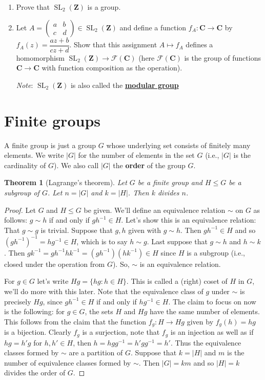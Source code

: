 \documentclass[12pt]{article}
\numberwithin{equation}{subsection}
\newtheorem{thm}[subsection]{Theorem}
\theoremstyle{note}
\newcommand{\SL}{\operatorname{SL}}
\begin{document}
\begin{enumerate}[label=\arabic*.]
	\begin{enumerate}
		\item Prove that $\SL_2(\mathbf{Z})$ is a group.
		\item Let $A=\begin{pmatrix} a & b \\ c & d \end{pmatrix} \in \SL_2(\mathbf{Z})$ and define a function $f_A\colon\mathbf{C}\to\mathbf{C}$ by $f_A(z)=\dfrac{az+b}{cz+d}$. Show that this assignment $A\mapsto f_A$ defines a homomorphism $\SL_2(\mathbf{Z})\to\mathcal{F}(\mathbf{C})$ (here $\mathcal{F}(\mathbf{C})$ is the group of functions $\mathbf{C}\to\mathbf{C}$ with function composition as the operation). 
		
		\textit{Note}: $\SL_2(\mathbf{Z})$ is also called the \href{https://en.wikipedia.org/wiki/Modular_group}{\textbf{modular group}}
	\end{enumerate}
\end{enumerate}


\section{Finite groups}
A finite group is just a group $G$ whose underlying set consists of finitely many elements. We write $|G|$ for the number of elements in the set $G$ (i.e., $|G|$ is the cardinality of $G$). We also call $|G|$ the \textbf{order} of the group $G$. 


\begin{thm}[Lagrange's theorem]\label{Lag-thm}
	Let $G$ be a finite group and $H\leq G$ be a subgroup of $G$. Let $n=|G|$ and $k=|H|$. Then $k$ divides $n$. 
\end{thm}

\begin{proof}
	Let $G$ and $H\leq G$ be given. We'll define an equivalence relation $\sim$ on $G$ as follows: $g\sim h$ if and only if $gh^{-1}\in H$. Let's show this is an equivalence relation: That $g\sim g$ is trivial. Suppose that $g,h$ given with $g\sim h$. Then $gh^{-1}\in H$ and so $(gh^{-1})^{-1}=hg^{-1}\in H$, which is to say $h\sim g$. Last suppose that $g\sim h$ and $h\sim k$. Then $gk^{-1}=gh^{-1}hk^{-1}=(gh^{-1})(hk^{-1})\in H$ since $H$ is a subgroup (i.e., closed under the operation from $G$). So, $\sim$ is an equivalence relation. 
	
	For $g\in G$ let's write $Hg=\{hg : h\in H\}$. This is called a (right) coset of $H$ in $G$, we'll do more with this later. Note that the equivalence class of $g$ under $\sim$ is precisely $Hg$, since $gh^{-1}\in H$ if and only if $hg^{-1}\in H$. The claim to focus on now is the following: for $g\in G$, the sets $H$ and $Hg$ have the same number of elements. This follows from the claim that the function $f_g\colon H \to Hg$ given by $f_g(h)=hg$ is a bijection. Clearly $f_g$ is a surjection, note that $f_g$ is an injection as well as if $hg=h'g$ for $h,h'\in H$, then $h=hgg^{-1}=h'gg^{-1}=h'$. Thus the equivalence classes formed by $\sim$ are a partition of $G$. Suppose that $k=|H|$ and $m$ is the number of equivalence classes formed by $\sim$. Then $|G|=km$ and so $|H|=k$ divides the order of $G$. \end{proof}
\end{document}
